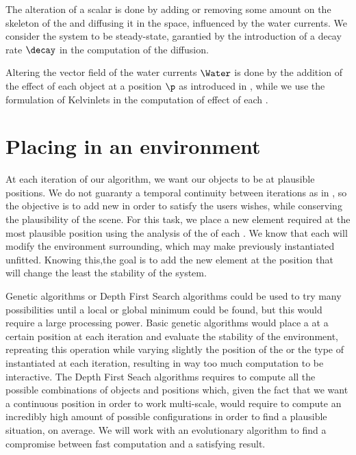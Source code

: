 The alteration of a scalar  is done by adding or removing some amount on the skeleton of the  and diffusing it in the space, influenced by the water currents. We consider the system to be steady-state, garantied by the introduction of a decay rate $\decay$ in the computation of the diffusion.

Altering the vector field of the water currents $\Water$ is done by the addition of the effect of each object at a position $\p$ as introduced in \citep{Wejchert1991}, while we use the formulation of Kelvinlets \cite{DeGoes2017} in the computation of effect of each .

\section{Placing  in an environment}
\label{sec:semantic-representation_generation-rules}
At each iteration of our algorithm, we want our objects to be at plausible positions. We do not guaranty a temporal continuity between iterations as in \citep{Ecormier-Nocca2021}, so the objective is to add new  in order to satisfy the users wishes, while conserving the plausibility of the scene. For this task, we place a new element required at the most plausible position using the analysis of the  of each . We know that each  will modify the environment surrounding, which may make previously instantiated  unfitted. Knowing this,the goal is to add the new element at the position that will change the least the stability of the system. 

Genetic algorithms or Depth First Search algorithms could be used to try many possibilities until a local or global minimum could be found, but this would require a large processing power. Basic genetic algorithms would place a  at a certain position at each iteration and evaluate the stability of the environment, repreating this operation while varying slightly the position of the  or the type of  instantiated at each iteration, resulting in way too much computation to be interactive. The Depth First Seach algorithms requires to compute all the possible combinations of objects and positions which, given the fact that we want a continuous position in order to work multi-scale, would require to compute an incredibly high amount of possible configurations in order to find a plausible situation, on average. We will work with an evolutionary algorithm to find a compromise between fast computation and a satisfying result.

